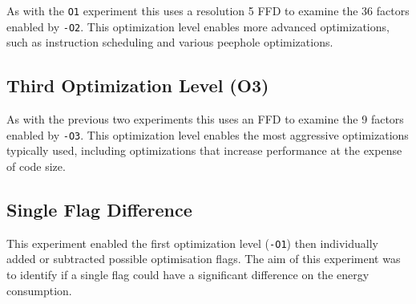 \documentclass[twocolumn]{article}
\begin{document}
As with the \texttt{O1} experiment this uses a resolution 5 FFD to examine the 36 factors enabled by \texttt{-O2}. This optimization level enables more advanced optimizations, such as instruction scheduling and various peephole optimizations.

\subsection*{Third Optimization Level (O3)}

As with the previous two experiments this uses an FFD to examine the 9 factors enabled by \texttt{-O3}. This optimization level enables the most aggressive optimizations typically used, including optimizations that increase performance at the expense of code size.



\subsection*{Single Flag Difference}

This experiment enabled the first optimization level (\texttt{-O1}) then individually added or subtracted possible optimisation flags. The aim of this experiment was to identify if a single flag could have a significant difference on the energy consumption.



\end{document}
